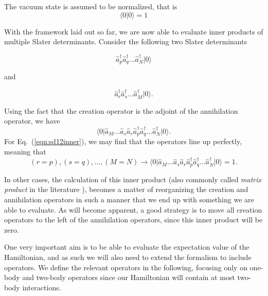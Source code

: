 The vacuum state is assumed to be normalized, that is
\begin{equation}
\langle 0 \vert 0 \rangle = 1
\label{eqn:vacuuminner}
\end{equation}

With the framework laid out so far, we are now able to evaluate inner products of multiple Slater determinants. 
Consider the following two Slater determinants

\begin{equation}
\hat{a}_p^\dagger \hat{a}_q^\dagger  ... \hat{a}_N^\dagger \vert 0 \rangle
\label{eqn:sd12}
\end{equation}

and

\begin{equation}
\hat{a}_r^\dagger \hat{a}_s^\dagger  ... \hat{a}_M^\dagger \vert 0 \rangle.
\label{eqn:sd12b}
\end{equation}


Using the fact that the creation operator is the adjoint of the annihilation operator, we have
\begin{equation}
\langle 0\vert  \hat{a}_M ...  \hat{a}_s  \hat{a}_r   \hat{a}_p^\dagger \hat{a}_q^\dagger  ... \hat{a}_N^\dagger \vert 0 \rangle.
\label{eqn:sd12inner}
\end{equation}
For Eq.~(\ref{eqn:sd12inner}), we may find that the operators line up perfectly, meaning that
\begin{equation}
(r=p), (s=q), ... ,(M=N) \rightarrow
\langle 0\vert  \hat{a}_M ...  \hat{a}_s  \hat{a}_r   \hat{a}_p^\dagger \hat{a}_q^\dagger  ... \hat{a}_N^\dagger \vert 0 \rangle = 1.
\label{eqn:sd12inner_prog}
\end{equation}

In other cases, the calculation of this inner product (also commonly
called \emph{matrix product} in the literature
\cite{ShavittBartlett2009}), becomes a matter of reorganizing the
creation and annihilation operators in such a manner that we end up
with something we are able to evaluate. As will become apparent, a
good strategy is to move all creation operators to the left of the
annihilation operators, since this inner product will be zero.

One very important aim is to be able to evaluate the expectation value
of the Hamiltonian, and as such we will also need to extend the
formalism to include operators. 
We define the relevant operators in the following, 
focusing only on one-body and two-body operators since our Hamiltonian will contain at most two-body interactions.

